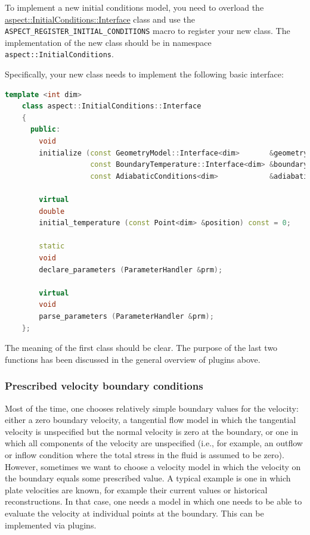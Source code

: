 \documentclass{article}
\begin{document}
To implement a new initial conditions model, you
need to overload the
\href{doc/doxygen/classaspect_1_1InitialConditions_1_1Interface.html}{aspect::InitialConditions::Interface}
class and use
the \texttt{ASPECT\_REGISTER\_INITIAL\_CONDITIONS} macro to register your new
class. The implementation of the new class should be in namespace
\texttt{aspect::InitialConditions}.

Specifically, your new class needs to implement the following basic interface:
\begin{lstlisting}[frame=single,language=C++]
    template <int dim>
    class aspect::InitialConditions::Interface
    {
      public:
        void
        initialize (const GeometryModel::Interface<dim>       &geometry_model,
                    const BoundaryTemperature::Interface<dim> &boundary_temperature,
                    const AdiabaticConditions<dim>            &adiabatic_conditions);

        virtual
        double
        initial_temperature (const Point<dim> &position) const = 0;

        static
        void
        declare_parameters (ParameterHandler &prm);

        virtual
        void
        parse_parameters (ParameterHandler &prm);
    };
\end{lstlisting}
The meaning of the first class should be clear. The purpose
of the last two functions has been discussed in the general overview of
plugins above.


\subsubsection{Prescribed velocity boundary conditions}
\label{sec:prescribed-velocity-boundary-conditions}


Most of the time, one chooses relatively simple boundary values for the
velocity: either a zero boundary velocity, a tangential flow model in which
the tangential velocity is unspecified but the normal velocity is zero at the
boundary, or one in which all components of the velocity are unspecified (i.e.,
for example, an outflow or inflow condition where the total stress in the fluid
is assumed to be zero). However, sometimes we want to choose a velocity model in
which the velocity on the boundary equals some prescribed value. A typical
example is one in which plate velocities are known, for example their current
values or historical reconstructions. In that case, one needs a model in which
one needs to be able to evaluate the velocity at individual points at the
boundary. This can be implemented via plugins.
\end{document}
